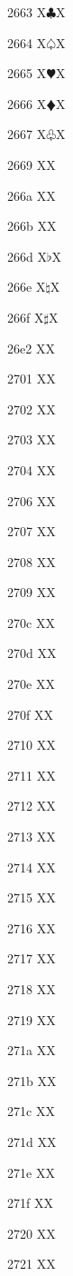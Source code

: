 \documentclass[11pt]{article}
\begin{document}
2663 X{\ensuremath{\clubsuit}}X

2664 X{\ensuremath{\varspadesuit}}X

2665 X{\ensuremath{\varheartsuit}}X

2666 X{\ensuremath{\vardiamondsuit}}X

2667 X{\ensuremath{\varclubsuit}}X

2669 X{\quarternote}X

266a X{\eighthnote}X

266b X{\twonotes}X

266d X{\ensuremath{\flat}}X

266e X{\ensuremath{\natural}}X

266f X{\ensuremath{\sharp}}X

26e2 X{\uranus}X

2701 X{}X

2702 X{}X

2703 X{}X

2704 X{}X

2706 X{}X

2707 X{}X

2708 X{}X

2709 X{}X

270c X{}X

270d X{}X

270e X{}X

270f X{}X

2710 X{}X

2711 X{}X

2712 X{}X

2713 X{}X

2714 X{}X

2715 X{}X

2716 X{}X

2717 X{}X

2718 X{}X

2719 X{}X

271a X{}X

271b X{}X

271c X{}X

271d X{}X

271e X{}X

271f X{}X

2720 X{}X

2721 X{}X
\end{document}
